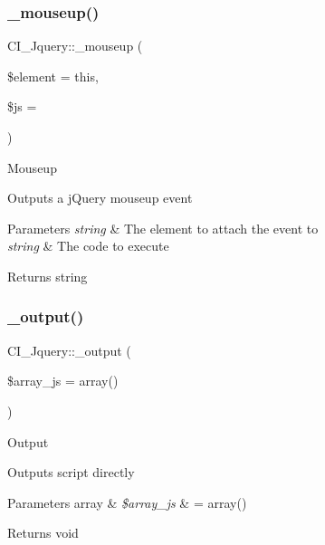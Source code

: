 \subsubsection{\texorpdfstring{\+\_\+mouseup()}{\_mouseup()}}
{\footnotesize\ttfamily C\+I\+\_\+\+Jquery\+::\+\_\+mouseup (\begin{DoxyParamCaption}\item[{}]{\$element = {\ttfamily \textquotesingle{}this\textquotesingle{}},  }\item[{}]{\$js = {\ttfamily \textquotesingle{}\textquotesingle{}} }\end{DoxyParamCaption})\hspace{0.3cm}{\ttfamily [protected]}}

Mouseup

Outputs a j\+Query mouseup event


\begin{DoxyParams}{Parameters}
{\em string} & The element to attach the event to \\
\hline
{\em string} & The code to execute \\
\hline
\end{DoxyParams}
\begin{DoxyReturn}{Returns}
string 
\end{DoxyReturn}
\mbox{\label{class_c_i___jquery_afdad71f4467f6b7e2ffce555cdb19581}} 
\subsubsection{\texorpdfstring{\+\_\+output()}{\_output()}}
{\footnotesize\ttfamily C\+I\+\_\+\+Jquery\+::\+\_\+output (\begin{DoxyParamCaption}\item[{}]{\$array\+\_\+js = {\ttfamily array()} }\end{DoxyParamCaption})\hspace{0.3cm}{\ttfamily [protected]}}

Output

Outputs script directly


\begin{DoxyParams}[1]{Parameters}
array & {\em \$array\+\_\+js} & = array() \\
\hline
\end{DoxyParams}
\begin{DoxyReturn}{Returns}
void 
\end{DoxyReturn}
\mbox{\label{class_c_i___jquery_ac0ef145ed0f3f9e722bfa93aafc86f97}} 
